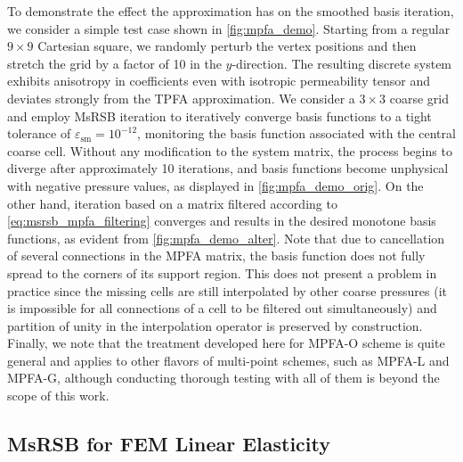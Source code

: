 To demonstrate the effect the approximation has on the smoothed basis iteration, we consider a simple test case shown in \cref{fig:mpfa_demo}.   Starting from a regular $9 \times 9$ Cartesian square, we randomly perturb the vertex positions and then stretch the grid by a factor of 10 in the $y$-direction.   The resulting discrete system exhibits anisotropy in coefficients even with isotropic permeability tensor and deviates strongly from the TPFA approximation.   We consider a $3 \times 3$ coarse grid and employ MsRSB iteration to iteratively converge basis functions to a tight tolerance of $\varepsilon_{\text{sm}} = 10^{-12}$, monitoring the basis function associated with the central coarse cell.   Without any modification to the system matrix, the process begins to diverge after approximately 10 iterations, and basis functions become unphysical with negative pressure values, as displayed in \cref{fig:mpfa_demo_orig}.   On the other hand, iteration based on a matrix filtered according to \cref{eq:msrsb_mpfa_filtering} converges and results in the desired monotone basis functions, as evident from \cref{fig:mpfa_demo_alter}.   Note that due to cancellation of several connections in the MPFA matrix, the basis function does not fully spread to the corners of its support region.   This does not present a problem in practice since the missing cells are still interpolated by other coarse pressures (it is impossible for all connections of a cell to be filtered out simultaneously) and partition of unity in the interpolation operator is preserved by construction.   Finally, we note that the treatment developed here for MPFA-O scheme is quite general and applies to other flavors of multi-point schemes, such as MPFA-L and MPFA-G, although conducting thorough testing with all of them is beyond the scope of this work.

\subsection{MsRSB for FEM Linear Elasticity}
\label{subsec:enhanced_msrsb_mech}

